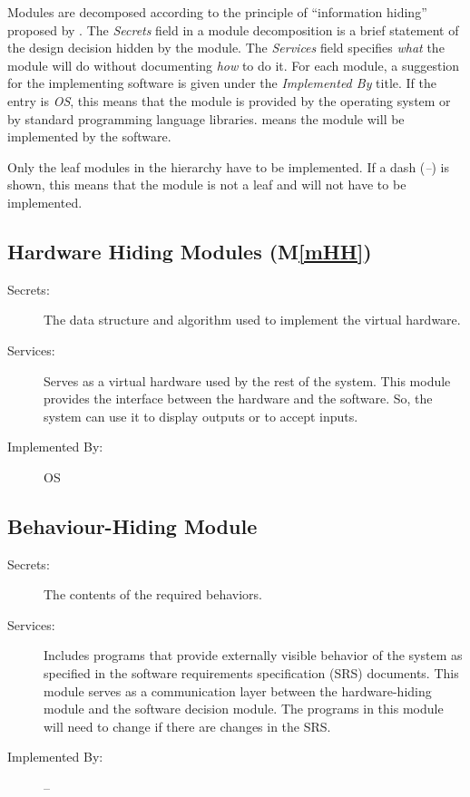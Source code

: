 \documentclass[12pt, titlepage]{article}
\newcommand{\mref}[1]{M\ref{#1}}
\begin{document}
Modules are decomposed according to the principle of ``information hiding''
proposed by \citet{ParnasEtAl1984}. The \emph{Secrets} field in a module
decomposition is a brief statement of the design decision hidden by the
module. The \emph{Services} field specifies \emph{what} the module will do
without documenting \emph{how} to do it. For each module, a suggestion for the
implementing software is given under the \emph{Implemented By} title. If the
entry is \emph{OS}, this means that the module is provided by the operating
system or by standard programming language libraries.  \emph{\progname{}} means the
module will be implemented by the \progname{} software.

Only the leaf modules in the hierarchy have to be implemented. If a dash
(\emph{--}) is shown, this means that the module is not a leaf and will not have
to be implemented.

\subsection{Hardware Hiding Modules (\mref{mHH})}

\begin{description}
\item[Secrets:]The data structure and algorithm used to implement the virtual
  hardware.
\item[Services:]Serves as a virtual hardware used by the rest of the
  system. This module provides the interface between the hardware and the
  software. So, the system can use it to display outputs or to accept inputs.
\item[Implemented By:] OS
\end{description}

\subsection{Behaviour-Hiding Module}

\begin{description}
\item[Secrets:]The contents of the required behaviors.
\item[Services:]Includes programs that provide externally visible behavior of
  the system as specified in the software requirements specification (SRS)
  documents. This module serves as a communication layer between the
  hardware-hiding module and the software decision module. The programs in this
  module will need to change if there are changes in the SRS.
\item[Implemented By:] --
\end{description}
\end{document}
